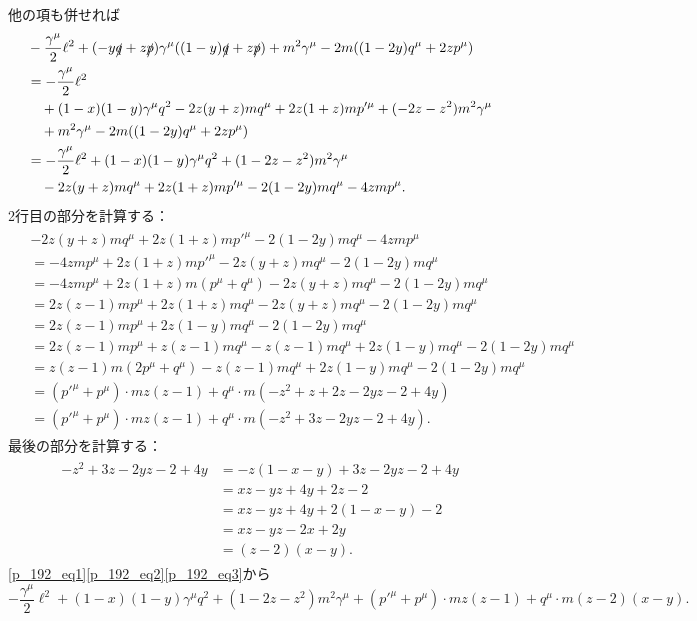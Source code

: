他の項も併せれば
\begin{align}
  \begin{split}
    & -\frac{\gamma^\mu}{2} \ell^2 + (-y\slashed{q}+z\slashed{p}) \gamma^\mu ((1-y)\slashed{q}+z\slashed{p})
    + m^2\gamma^\mu - 2m ((1-2y)q^\mu + 2zp^\mu) \\
    &= -\frac{\gamma^\mu}{2} \ell^2 \\
    & \quad + (1-x)(1-y) \gamma^\mu q^2 - 2z(y+z)m q^\mu + 2z(1+z)mp'^\mu + (-2z - z^2) m^2 \gamma^\mu \\
    & \quad + m^2\gamma^\mu - 2m ((1-2y)q^\mu + 2zp^\mu) \\
    &= -\frac{\gamma^\mu}{2} \ell^2 + (1-x)(1-y) \gamma^\mu q^2 + (1 -2z - z^2) m^2 \gamma^\mu \\
    &\quad - 2z(y+z)m q^\mu + 2z(1+z)mp'^\mu - 2(1-2y)mq^\mu - 4zmp^\mu .
  \end{split}
  \label{p_192_eq1}
\end{align}
2行目の部分を計算する：
\begin{align}
  \begin{split}
    & - 2z(y+z)m q^\mu + 2z(1+z)mp'^\mu - 2(1-2y)mq^\mu - 4zmp^\mu \\
    &= - 4zmp^\mu + 2z(1+z)mp'^\mu - 2z(y+z)m q^\mu - 2(1-2y)mq^\mu \\
    &= - 4zmp^\mu + 2z(1+z)m(p^\mu + q^\mu) - 2z(y+z)m q^\mu - 2(1-2y)mq^\mu \\
    &= 2z(z-1)mp^\mu + 2z(1+z)mq^\mu - 2z(y+z)m q^\mu - 2(1-2y)mq^\mu \\
    &= 2z(z-1)mp^\mu + 2z(1-y)m q^\mu - 2(1-2y)mq^\mu \\
    &= 2z(z-1)mp^\mu + z(z-1)mq^\mu - z(z-1)mq^\mu + 2z(1-y)m q^\mu - 2(1-2y)mq^\mu \\
    &= z(z-1)m(2p^\mu+q^\mu) - z(z-1)mq^\mu + 2z(1-y)m q^\mu - 2(1-2y)mq^\mu \\
    &= (p'^\mu+p^\mu) \cdot m z(z-1) + q^\mu \cdot m ( -z^2 + z + 2z - 2yz - 2 + 4y) \\
    &= (p'^\mu+p^\mu) \cdot m z(z-1) + q^\mu \cdot m ( -z^2 + 3z - 2yz - 2 + 4y) .
  \end{split}
  \label{p_192_eq2}
\end{align}
最後の部分を計算する：
\begin{align}
  \begin{split}
    -z^2 + 3z - 2yz - 2 + 4y &= -z(1-x-y) + 3z - 2yz - 2 + 4y \\
    &= xz - yz + 4y + 2z - 2 \\
    &= xz - yz + 4y + 2(1-x-y) - 2 \\
    &= xz - yz - 2x + 2y \\
    &= (z - 2)(x - y) .
  \end{split}
  \label{p_192_eq3}
\end{align}
\eqref{p_192_eq1}\eqref{p_192_eq2}\eqref{p_192_eq3}から
\[ -\frac{\gamma^\mu}{2} \ell^2 + (1-x)(1-y) \gamma^\mu q^2 + (1 -2z - z^2) m^2 \gamma^\mu + (p'^\mu+p^\mu) \cdot m z(z-1) + q^\mu \cdot m (z - 2)(x - y) . \]

